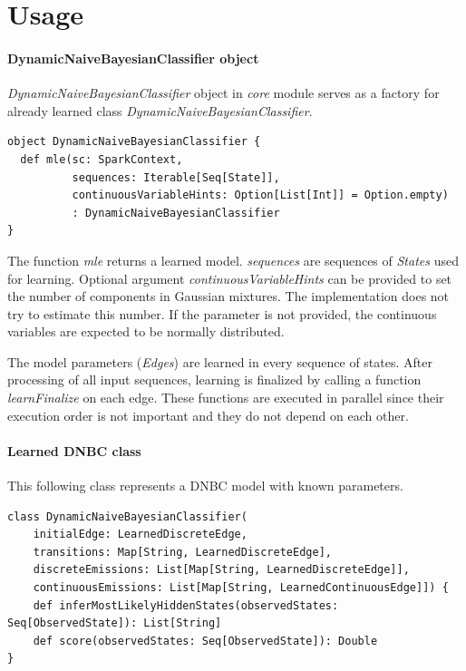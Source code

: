 \documentclass[thesis=B,english]{FITthesis}[2012/06/26]
\begin{document}
\section{Usage}

\paragraph{DynamicNaiveBayesianClassifier object}

\textit{DynamicNaiveBayesianClassifier} object in \textit{core} module serves as a factory for already learned class \textit{DynamicNaiveBayesianClassifier}.

\begin{lstlisting}[style=myScalaStyle]
object DynamicNaiveBayesianClassifier {
  def mle(sc: SparkContext,
          sequences: Iterable[Seq[State]],
          continuousVariableHints: Option[List[Int]] = Option.empty)
          : DynamicNaiveBayesianClassifier
}
\end{lstlisting}

The function \textit{mle} returns a learned model. \textit{sequences} are sequences of \textit{States} used for learning. Optional argument \textit{continuousVariableHints} can be provided to set the number of components in Gaussian mixtures. The implementation does not try to estimate this number. If the parameter is not provided, the continuous variables are expected to be normally distributed.

The model parameters (\textit{Edges}) are learned in every sequence of states. After processing of all input sequences, learning is finalized by calling a function \textit{learnFinalize} on each edge. These functions are executed in parallel since their execution order is not important and they do not depend on each other.

\paragraph{Learned DNBC class}

This following class represents a DNBC model with known parameters.

\begin{lstlisting}[style=myScalaStyle]
class DynamicNaiveBayesianClassifier(
	initialEdge: LearnedDiscreteEdge,
	transitions: Map[String, LearnedDiscreteEdge],
	discreteEmissions: List[Map[String, LearnedDiscreteEdge]],
	continuousEmissions: List[Map[String, LearnedContinuousEdge]]) {
	def inferMostLikelyHiddenStates(observedStates: Seq[ObservedState]): List[String]
	def score(observedStates: Seq[ObservedState]): Double
}
\end{lstlisting}
\end{document}
